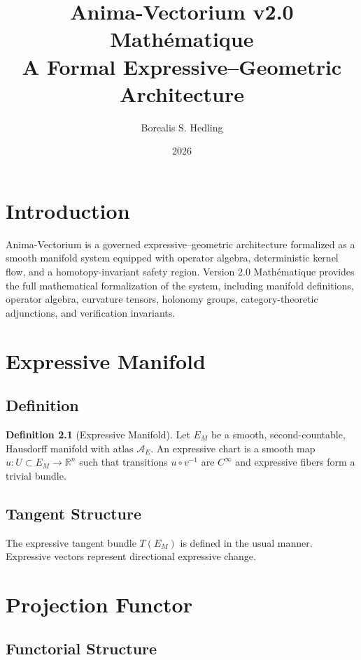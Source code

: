 \documentclass[11pt,oneside]{memoir}
\title{Anima-Vectorium v2.0 Mathématique \\ 
\large A Formal Expressive--Geometric Architecture}
\author{Borealis S. Hedling}
\date{2026}
\theoremstyle{definition}
\newtheorem{definition}{Definition}[chapter]
\theoremstyle{plain}
\theoremstyle{remark}
\begin{document}
\maketitle

\tableofcontents

\chapter{Introduction}

Anima-Vectorium is a governed expressive--geometric architecture formalized as a 
smooth manifold system equipped with operator algebra, deterministic kernel flow, 
and a homotopy-invariant safety region. Version 2.0 Mathématique provides the 
full mathematical formalization of the system, including manifold definitions, 
operator algebra, curvature tensors, holonomy groups, category-theoretic adjunctions, 
and verification invariants.

\chapter{Expressive Manifold}

\section{Definition}

\begin{definition}[Expressive Manifold]
Let $E_M$ be a smooth, second-countable, Hausdorff manifold with atlas 
$\mathcal{A}_E$. An expressive chart is a smooth map 
$u : U \subset E_M \to \mathbb{R}^n$ such that transitions 
$u \circ v^{-1}$ are $C^\infty$ and expressive fibers form a trivial bundle.
\end{definition}

\section{Tangent Structure}

The expressive tangent bundle $T(E_M)$ is defined in the usual manner. Expressive 
vectors represent directional expressive change.

\chapter{Projection Functor}

\section{Functorial Structure}
\end{document}
